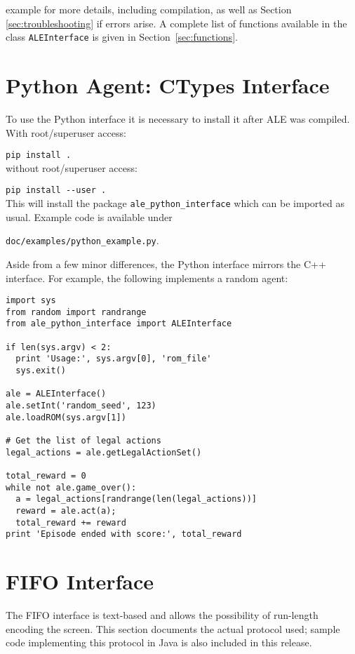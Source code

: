 \documentclass[12pt]{article}
\begin{document}
\noindent example for more details, including compilation, as
well as Section \ref{sec:troubleshooting} if errors arise.
A complete list of functions available in the class \verb+ALEInterface+ is given in Section~\ref{sec:functions}.

\section{Python Agent: CTypes Interface}\label{sec:python_interface}

To use the Python interface it is necessary to install it after ALE was compiled. With root/superuser access:

\verb+pip install .+\\

\noindent without root/superuser access:

\verb+pip install --user .+\\

This will install the package \verb+ale_python_interface+ which can be imported as usual. Example code is available under 
\begin{center} \verb+doc/examples/python_example.py+. \end{center}

Aside from a few minor differences, the Python interface mirrors the C++ interface. For example, the following implements a random agent: 

\begin{verbatim}
import sys
from random import randrange
from ale_python_interface import ALEInterface

if len(sys.argv) < 2:
  print 'Usage:', sys.argv[0], 'rom_file'
  sys.exit()

ale = ALEInterface()
ale.setInt('random_seed', 123)
ale.loadROM(sys.argv[1])

# Get the list of legal actions
legal_actions = ale.getLegalActionSet()

total_reward = 0
while not ale.game_over():
  a = legal_actions[randrange(len(legal_actions))]
  reward = ale.act(a);
  total_reward += reward
print 'Episode ended with score:', total_reward
\end{verbatim}

\section{FIFO Interface}\label{sec:pipes_interface}

The FIFO interface is text-based and allows the possibility of run-length encoding the screen. This section documents the actual protocol used; sample code implementing this protocol in Java is also included in this release.
\end{document}

